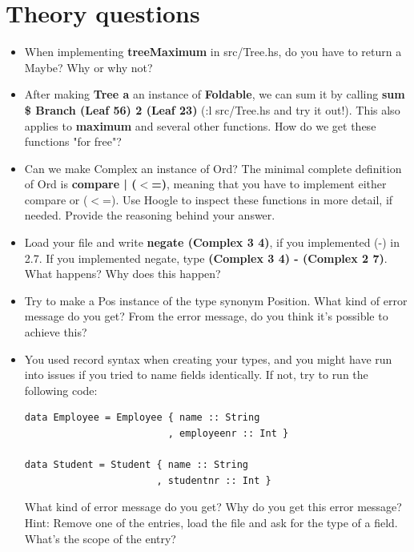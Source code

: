 \documentclass{article}
\begin{document}
\section{Theory questions}
\begin{itemize}
    \item When implementing \textbf{treeMaximum} in src/Tree.hs, do you have to return a Maybe? Why or why not?
    \item After making \textbf{Tree a} an instance of \textbf{Foldable}, we can sum it by calling \textbf{sum \$ Branch (Leaf 56) 2 (Leaf 23)} (:l src/Tree.hs and try it out!). This also applies to \textbf{maximum} and several other functions. How do we get these functions "for free"?
    \item Can we make Complex an instance of Ord? The minimal complete definition of Ord is \textbf{compare | ($<$=)}, meaning that you have to implement either compare or ($<$=). Use Hoogle to inspect these functions in more detail, if needed. Provide the reasoning behind your answer.
    \item Load your file and write \textbf{negate (Complex 3 4)}, if you implemented (-) in 2.7. If you implemented negate, type \textbf{(Complex 3 4) - (Complex 2 7)}. What happens? Why does this happen?
    \item Try to make a Pos instance of the type synonym Position. What kind of error message do you get? From the error message, do you think it's possible to achieve this?
    \item You used record syntax when creating your types, and you might have run into issues if you tried to name fields identically. If not, try to run the following code:
    \lstset{language=Haskell}
    \begin{lstlisting}
data Employee = Employee { name :: String
                         , employeenr :: Int }
                         
data Student = Student { name :: String
                       , studentnr :: Int }
    \end{lstlisting}
    What kind of error message do you get? Why do you get this error message? Hint: Remove one of the entries, load the file and ask for the type of a field. What's the scope of the entry?
\end{itemize}
\end{document}
